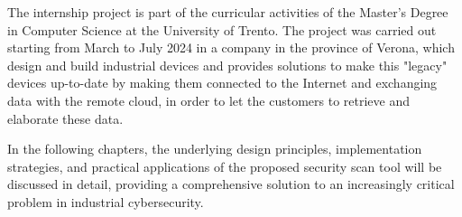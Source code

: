 The internship project is part of the curricular activities of the Master's Degree in Computer Science at the University of Trento. The project was carried out starting from March to July 2024 in a company in the province of Verona, which design and build industrial devices and provides solutions to make this "legacy" devices up-to-date by making them connected to the Internet and exchanging data with the remote cloud, in order to let the customers to retrieve and elaborate these data.

In the following chapters, the underlying design principles, implementation strategies, and practical applications of the proposed security scan tool will be discussed in detail, providing a comprehensive solution to an increasingly critical problem in industrial cybersecurity.
